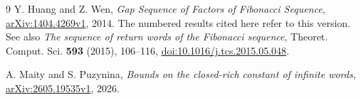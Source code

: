 \documentclass[11pt]{amsart}
\begin{document}
\begin{thebibliography}{9}
Y. Huang and Z. Wen,
\emph{Gap Sequence of Factors of Fibonacci Sequence},
\href{https://arxiv.org/abs/1404.4269v1}{arXiv:1404.4269v1}, 2014.
The numbered results cited here refer to this version.
See also \emph{The sequence of return words of the Fibonacci sequence},
Theoret. Comput. Sci. \textbf{593} (2015), 106--116,
\href{https://doi.org/10.1016/j.tcs.2015.05.048}{doi:10.1016/j.tcs.2015.05.048}.

A. Maity and S. Puzynina,
\emph{Bounds on the closed-rich constant of infinite words},
\href{https://arxiv.org/abs/2605.19535v1}{arXiv:2605.19535v1}, 2026.
\end{thebibliography}
\end{document}
